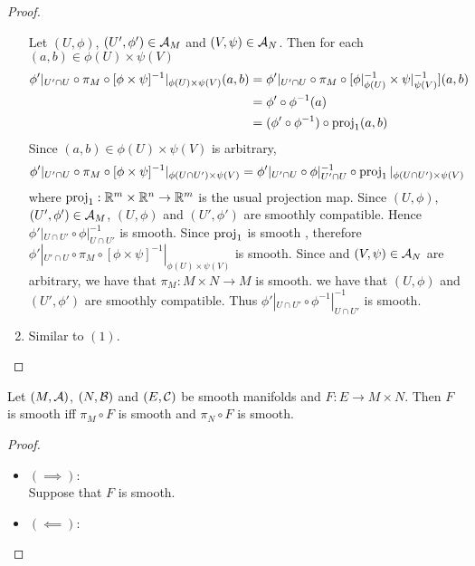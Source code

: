 \documentclass{book}
\begin{document}
\begin{proof}
\begin{enumerate}
		
		Let $(U, \phi)$, $(U', \phi') \in \mathcal{A}_M$ and $(V, \psi) \in \mathcal{A}_N$. Then for each $(a,b) \in \phi(U) \times \psi(V)$
		\begin{align*}
			\phi'|_{U' \cap U} \circ \pi_M \circ [\phi \times \psi]^{-1}|_{\phi(U) \times \psi(V)} (a,b)
			& = \phi'|_{U' \cap U} \circ \pi_M \circ [\phi|_{\phi(U)}^{-1} \times \psi|_{\psi(V)}^{-1}] (a,b)\\ 
			& = \phi' \circ \phi^{-1}(a)  \\
			& = (\phi' \circ \phi^{-1}) \circ \operatorname{\text{proj}}_1(a, b)
		\end{align*}
		Since $(a,b) \in \phi(U) \times \psi(V)$ is arbitrary, 
		$$\phi'|_{U' \cap U} \circ \pi_M \circ [\phi \times \psi]^{-1}|_{\phi(U \cap U') \times \psi(V)} = \phi'|_{U' \cap U} \circ \phi|_{U' \cap U}^{-1} \circ \operatorname{\text{proj}}_1|_{\phi(U \cap U') \times \psi(V)}$$ 
		where $\operatorname{\text{proj}}_1: \mathbb{R}^m \times \mathbb{R}^n \rightarrow \mathbb{R}^m$ is the usual projection map. Since $(U, \phi)$, $(U', \phi') \in \mathcal{A}_M$, $(U, \phi)$ and $(U', \phi')$ are smoothly compatible. Hence $\phi'|_{U \cap U'} \circ \phi|_{U \cap U'}^{-1}$ is smooth. Since $\operatorname{\text{proj}}_1$ is smooth , therefore $\phi'|_{U' \cap U} \circ \pi_M \circ [\phi \times \psi]^{-1}|_{\phi(U) \times \psi(V)}$ is smooth. Since  and $(V, \psi) \in \mathcal{A}_N$ are arbitrary, we have that $\pi_M: M \times N \rightarrow M$ is smooth.  we have that $(U, \phi)$ and $(U', \phi')$ are smoothly compatible. Thus $\phi'|_{U \cap U'} \circ \phi^{-1}|_{U \cap U'}^{-1}$ is smooth.  
		\item Similar to $(1)$.
	\end{enumerate}
\end{proof}

\begin{ex} 
	Let $(M, \mathcal{A})$, $(N, \mathcal{B})$ and $(E, \mathcal{C})$ be smooth manifolds and $F: E \rightarrow M \times N$. Then $F$ is smooth iff $\pi_M \circ F$ is smooth and $\pi_N \circ F$ is smooth.  
\end{ex}

\begin{proof}\
	\begin{itemize}
		\item $(\implies)$: \\
		Suppose that $F$ is smooth. 
		\item $(\impliedby)$: \\
	\end{itemize}
\end{proof}
\end{document}
